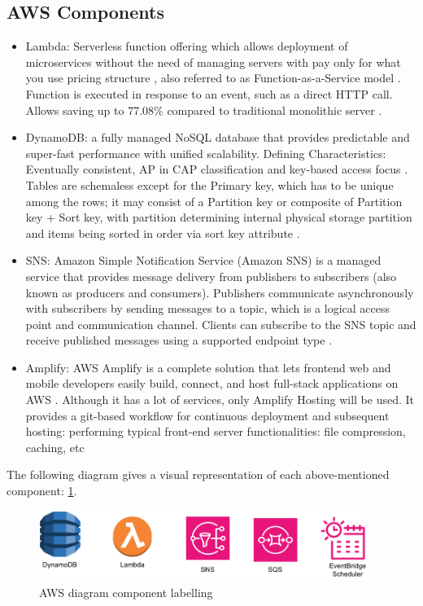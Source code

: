 \subsection{AWS Components}
\begin{itemize}
    \item Lambda: Serverless function offering which allows deployment of microservices without the need of managing servers with pay only for what you use pricing structure \cite{LambdaCostSave}, also referred to as Function-as-a-Service model \cite{MALAWSKI2020502}. Function is executed in response to an event, such as a direct HTTP call.  Allows saving up to 77.08\% compared to traditional monolithic server \cite{LambdaCostSave}.
    \item DynamoDB: a fully managed NoSQL database that provides predictable and super-fast performance with unified scalability. Defining Characteristics: Eventually consistent, AP in CAP classification and key-based access focus \cite{DynamoDB}. Tables are schemaless except for the Primary key, which has to be unique among the rows; it may consist of a Partition key or composite of Partition key + Sort key, with partition determining internal physical storage partition and items being sorted in order via sort key attribute \cite{awsDynamoWebsite}. 
    \item SNS: Amazon Simple Notification Service (Amazon SNS) is a managed service that provides message delivery from publishers to subscribers (also known as producers and consumers). Publishers communicate asynchronously with subscribers by sending messages to a topic, which is a logical access point and communication channel. Clients can subscribe to the SNS topic and receive published messages using a supported endpoint type \cite{sns}. 
    \item Amplify: AWS Amplify is a complete solution that lets frontend web and mobile developers easily build, connect, and host full-stack applications on AWS \cite{amplify}. Although it has a lot of services, only Amplify Hosting will be used. It provides a git-based workflow for continuous deployment and subsequent hosting: performing typical front-end server functionalities: file compression, caching, etc
\end{itemize}
The following diagram gives a visual representation of each above-mentioned component: \ref{fig:awsComponents}.
\begin{figure}
    
    \centering
    \includegraphics[width=0.95\textwidth,keepaspectratio]{../images/AWS_components.pdf}
    \caption{AWS diagram component labelling}
    \label{fig:awsComponents}
\end{figure}
